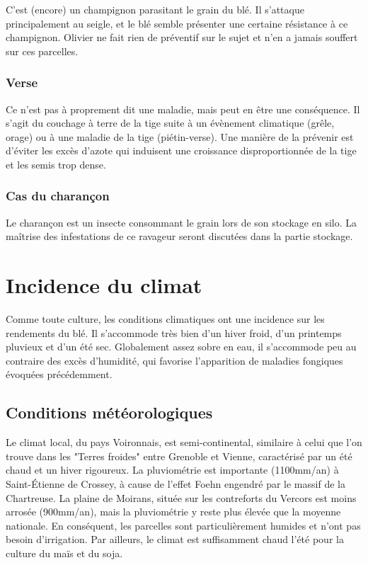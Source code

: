 \documentclass{article}
\begin{document}
C'est (encore) un champignon parasitant le grain du blé. Il s'attaque principalement au seigle, et le blé semble présenter une certaine résistance à ce champignon. Olivier ne fait rien de préventif sur le sujet et n'en a jamais souffert sur ces parcelles. 

\subsubsection{Verse}

Ce n'est pas à proprement dit une maladie, mais peut en être une conséquence. Il s'agit du couchage à terre de la tige suite à un évènement climatique (grêle, orage) ou à une maladie de la tige (piétin-verse). Une manière de la prévenir est d'éviter les excès d'azote qui induisent une croissance disproportionnée de la tige et les semis trop dense. 

\subsubsection{Cas du charançon}

Le charançon est un insecte consommant le grain lors de son stockage en silo. La maîtrise des infestations de ce ravageur seront discutées dans la partie stockage. 

\section{Incidence du climat}

Comme toute culture, les conditions climatiques ont une incidence sur les rendements du blé. Il s'accommode très bien d'un hiver froid, d'un printemps pluvieux et d'un été sec. Globalement assez sobre en eau, il s'accommode peu au contraire des excès d'humidité, qui favorise l'apparition de maladies fongiques évoquées précédemment.  

\subsection{Conditions météorologiques}

Le climat local, du pays Voironnais, est semi-continental, similaire à celui que l'on trouve dans les "Terres froides" entre Grenoble et Vienne, caractérisé par un été chaud et un hiver rigoureux. La pluviométrie est importante (1100mm/an) à Saint-Étienne de Crossey, à cause de l'effet Foehn engendré par le massif de la Chartreuse. La plaine de Moirans, située sur les contreforts du Vercors est moins arrosée (900mm/an), mais la pluviométrie y reste plus élevée que la moyenne nationale. En conséquent, les parcelles sont particulièrement humides et n'ont pas besoin d'irrigation. Par ailleurs, le climat est suffisamment chaud l'été pour la culture du maïs et du soja. 
\end{document}
